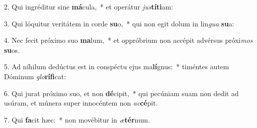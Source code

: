 2. Qui ingréditur sine \textbf{má}cula,~*  et operátur \textit{jus}\textbf{tí}\textbf{ti}am:\

3. Qui lóquitur veritátem in corde \textbf{su}o,~*  qui non egit dolum in lin\textit{gua} \textbf{su}a:\

4. Nec fecit próximo suo \textbf{ma}lum,~*  et oppróbrium non accépit advérsus próxi\textit{mos} \textbf{su}os.\

5. Ad níhilum dedúctus est in conspéctu ejus ma\textbf{lí}gnus:~*  timéntes autem Dóminum \textit{glo}\textbf{rí}\textbf{fi}cat:\

6. Qui jurat próximo suo, et non \textbf{dé}cipit,~*  qui pecúniam suam non dedit ad usúram, et múnera super innocéntem non \textit{ac}\textbf{cé}pit.\

7. Qui \textbf{fa}cit hæc:~*  non movébitur in \textit{æ}\textbf{tér}num.\

